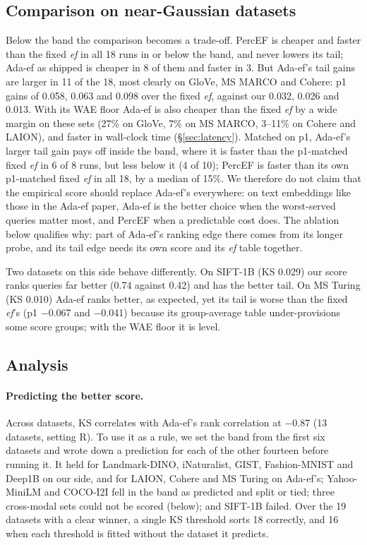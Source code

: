 \documentclass[sigconf,anonymous]{acmart}
\newcommand{\ef}{\textit{ef}}
\begin{document}
\subsection{Comparison on near-Gaussian datasets}\label{sec:neargauss}

Below the band the comparison becomes a trade-off. PercEF is cheaper and faster than the fixed \ef{}
in all 18 runs in or below the band, and never lowers its tail; Ada-ef as shipped is cheaper in 8 of
them and faster in 3. But Ada-ef's tail gains are larger in 11 of the 18, most clearly on GloVe,
MS MARCO and Cohere: p1 gains of 0.058, 0.063 and 0.098 over the fixed \ef{}, against our 0.032,
0.026 and 0.013. With its WAE floor Ada-ef is also cheaper than the fixed \ef{} by a wide margin on
these sets (27\% on GloVe, 7\% on MS MARCO, 3--11\% on Cohere and LAION), and faster in
wall-clock time (\S\ref{sec:latency}). Matched on p1, Ada-ef's larger tail gain pays off inside
the band, where it is faster than the p1-matched fixed \ef{} in 6 of 8 runs, but less below it (4
of 10); PercEF is faster than its own p1-matched fixed \ef{} in all 18, by a median of 15\%. We therefore do not claim that the empirical score should
replace Ada-ef's everywhere: on text embeddings like those in the Ada-ef paper, Ada-ef is the better
choice when the worst-served queries matter most, and PercEF when a predictable cost does. The
ablation below qualifies why: part of Ada-ef's ranking edge there comes from its longer probe, and
its tail edge needs its own score and its \ef{} table together.

Two datasets on this side behave differently. On SIFT-1B (KS 0.029) our score ranks queries far
better (0.74 against 0.42) and has the better tail. On MS Turing (KS 0.010) Ada-ef ranks better, as
expected, yet its tail is worse than the fixed \ef{}'s (p1 $-$0.067 and $-$0.041) because its
group-average table under-provisions some score groups; with the WAE floor it is level.

\subsection{Analysis}\label{sec:analysis}

\paragraph{Predicting the better score.}\label{sec:predict}
Across datasets, KS correlates with Ada-ef's rank correlation at $-0.87$ (13 datasets, setting R).
To use it as a rule, we set the band from the first six datasets and wrote down a prediction for
each of the other fourteen before running it. It held for Landmark-DINO, iNaturalist, GIST,
Fashion-MNIST and Deep1B on our side, and for LAION, Cohere and MS Turing on Ada-ef's; Yahoo-MiniLM
and COCO-I2I fell in the band as predicted and split or tied; three cross-modal sets could not be
scored (below); and SIFT-1B failed. Over the 19 datasets with a clear winner, a single KS threshold
sorts 18 correctly, and 16 when each threshold is fitted without the dataset it predicts.
\end{document}
